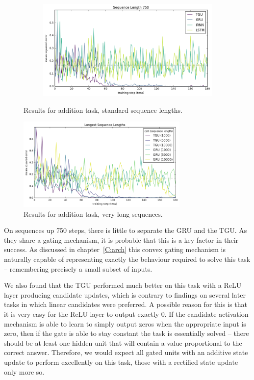 \begin{figure}
\begin{subfigure}[t]{0.75\textwidth}
\includegraphics[width=\textwidth]{exps/addition/sl750}
\caption{}
\label{fig:add750}
\end{subfigure}

\caption{Results for addition task, standard sequence lengths.}
\label{fig:addresults}
\end{figure}

\begin{figure}
\centering
\includegraphics[width=0.75\textwidth]{exps/addition/long}
\caption{Results for addition task, very long sequences.}
\label{fig:addlong}
\end{figure}

On sequences up 750 steps, there is little to separate the GRU and the TGU. As they share a gating
mechanism, it is probable that this is a key factor in their success. As discussed in
chapter~\ref{C:arch} this convex gating mechanism is naturally capable of representing exactly the
behaviour required to solve this task -- remembering precisely a small subset of inputs.

We also
found that the TGU performed much better on this task with a ReLU layer producing candidate updates,
which is contrary to findings on several later tasks in which linear candidates were preferred.
A possible reason for this is that it is very easy for the ReLU layer to output exactly \(0\).
If the candidate activation mechanism is able to learn to simply output zeros when the appropriate
input is zero, then if the gate is able to stay constant the task is essentially solved -- there should
be at least one hidden unit that will contain a value proportional to the correct answer. Therefore,
we would expect all gated units with an additive state update to perform excellently on this task, those
with a rectified state update only more so.

